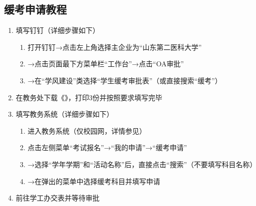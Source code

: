 \subsection[缓考申请教程]{缓考申请教程\footnotemark}
\label{deferred_exam}
\begin{enumerate}
    \item 填写钉钉\footnotemark（详细步骤如下）
          \begin{enumerate}
              \item 打开钉钉→点击左上角选择主企业为“山东第二医科大学”
              \item →点击页面最下方菜单栏“工作台”→点击“OA审批”
              \item →在“学风建设”类选择“学生缓考审批表”（或直接搜索“缓考”）
          \end{enumerate}
    \item 在教务处下载《》，打印3份并按照要求填写完毕
    \item 填写教务系统（详细步骤如下）
          \begin{enumerate}
              \item 进入教务系统（仅校园网，详情参见）
              \item 点击左侧菜单“考试报名”→“我的申请”→“缓考申请”
              \item →选择“学年学期”和“活动名称”后，直接点击“搜索”（不要填写科目名称）
              \item →在弹出的菜单中选择缓考科目并填写申请\footnotemark
          \end{enumerate}
    \item 前往学工办交表并等待审批
\end{enumerate}

